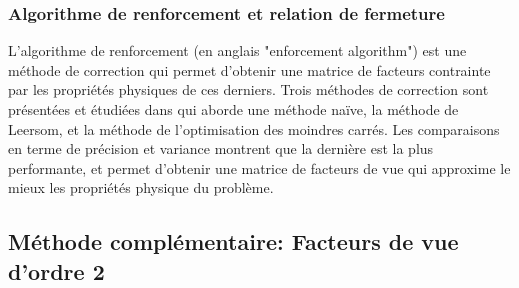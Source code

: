 \subsubsection{Algorithme de renforcement et relation de fermeture}

L'algorithme de renforcement (en anglais "enforcement algorithm") est une méthode de correction qui permet d'obtenir une matrice de facteurs contrainte par les propriétés physiques de ces derniers. Trois méthodes de correction sont présentées et étudiées dans \cite{renforcement} qui aborde une méthode naïve, la méthode de Leersom, et la méthode de l'optimisation des moindres carrés. Les comparaisons en terme de précision et variance montrent que la dernière est la plus performante, et permet d'obtenir une matrice de facteurs de vue qui approxime le mieux les propriétés physique du problème.

\subsection{Méthode complémentaire: Facteurs de vue d'ordre 2}

